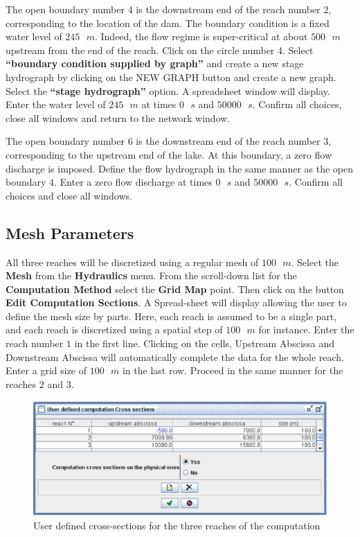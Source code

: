 \documentclass[a4paper,12pt]{article}
\begin{document}
The open boundary number $4$ is the downstream end of the reach number
$2$, corresponding to the location of the dam. The boundary condition
is a fixed water level of $245\mbox{ }m$. Indeed, the flow regime is super-critical at about $500\mbox{ }m$
upstream from the end of the reach. Click on the circle number 4. Select \textbf{{}``boundary condition supplied
by graph''} and create a new stage hydrograph by clicking on the
NEW GRAPH button and create a new graph. Select the \textbf{{}``stage hydrograph''}
option. A spreadsheet window will display. Enter the water level of $245\mbox{ }m$
at times $0\mbox{ }s$ and $50000\mbox{ }s$. Confirm all choices, close all windows and return to the
network window.

\vspace{0.5cm}

The open boundary number $6$ is the downstream end of the reach number $3$, corresponding to the upstream end of the lake. At this boundary,  a zero flow discharge is imposed.
Define the flow hydrograph in the same manner as the open boundary $4$. Enter a zero flow discharge at times $0\mbox{ }s$ and $50000\mbox{ }s$. Confirm all choices and close all
windows.


\subsection{Mesh Parameters}

\hspace{0.5cm} All three reaches will be discretized using a regular mesh of $100\mbox{ }m$. Select
the \textbf{Mesh} from the \textbf{Hydraulics} menu. From the
scroll-down list for the \textbf{Computation Method} select the \textbf{Grid
Map} point. Then click on the button \textbf{Edit Computation Sections}.
A Spread-sheet will display allowing the user to define the mesh size by parts.
Here, each reach is assumed to be a single part,
and each reach is discretized using a spatial step of $100\mbox{ }m$ for instance. Enter the reach number $1$ in
the first line. Clicking on the cells,
Upstream Abscissa and Downstream Abscissa will automatically complete the data for the whole reach. Enter a grid size of $100\mbox{ }m$
in the last row. Proceed in the same manner for the reaches $2$ and
$3$. 

\begin{figure}[h]
  \begin{center}
  \includegraphics[scale=0.6]{grid-map}
  \caption{User defined cross-sections for the three reaches of the computation}
  \label{fig:User-defined-cross-sections-junction}
  \end{center}
\end{figure}
\end{document}

